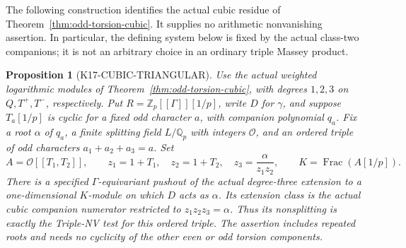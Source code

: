 \documentclass[11pt,a4paper]{article}
\newtheorem{proposition}[theorem]{Proposition}
\theoremstyle{definition}
\begin{document}
The following construction identifies the actual cubic residue of
Theorem~\ref{thm:odd-torsion-cubic}. It supplies no arithmetic
nonvanishing assertion. In particular, the defining system below is fixed
by the actual class-two companions; it is not an arbitrary choice in an
ordinary triple Massey product.

\begin{proposition}[K17-CUBIC-TRIANGULAR]
\label{prop:cubic-triangular}
Use the actual weighted logarithmic modules of
Theorem~\ref{thm:odd-torsion-cubic}, with degrees \(1,2,3\) on
\(Q,T^+,T^-\), respectively. Put
\(R=\mathbb Z_p[[\Gamma]][1/p]\), write \(D\) for \(\gamma\), and suppose
\(T_a[1/p]\) is cyclic for a fixed odd character \(a\), with companion
polynomial \(q_a\). Fix a root \(\alpha\) of \(q_a\), a finite splitting
field \(L/\mathbb Q_p\) with integers \(\mathcal O\), and an ordered
triple of odd characters \(a_1+a_2+a_3=a\). Set
\[
 A=\mathcal O[[T_1,T_2]],\qquad
 z_1=1+T_1,\quad z_2=1+T_2,\quad
 z_3=\frac{\alpha}{z_1z_2},\qquad K=\operatorname{Frac}(A[1/p]).
 \tag{CT.1}
\]
There is a specified \(\Gamma\)-equivariant pushout of the actual
degree-three extension to a one-dimensional \(K\)-module on which
\(D\) acts as \(\alpha\). Its extension class is the actual cubic
companion numerator restricted to \(z_1z_2z_3=\alpha\). Thus its
nonsplitting is exactly the Triple-NV test for this ordered triple.
The assertion includes repeated roots and needs no cyclicity of the
other even or odd torsion components.
\end{proposition}
\end{document}
